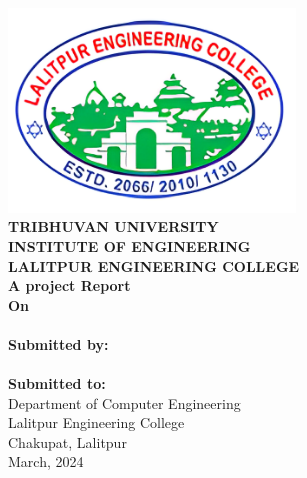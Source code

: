 \begin{center}

    \thispagestyle{empty}

    \includegraphics[width= 3in ]{img/leclogo21.png} \\
    \vspace{0.05 in}
    {\fontsize{12 pt}{12} \selectfont\textbf{TRIBHUVAN UNIVERSITY} \\
        \textbf{INSTITUTE OF ENGINEERING} \\
        \textbf{LALITPUR ENGINEERING COLLEGE}} \\

    \vspace{0.5 in}
    \textbf{A project Report}\\
    {\fontsize{12 pt}{12} \selectfont\textbf{On}\\}
    {\fontsize{12 pt}{12} \selectfont \textbf{\thetitle}}\\
    \vspace{1.1 in}
    \textbf{ Submitted by:}  \\
    {\theauthor} \\
    \vspace{0.8 in}
    \textbf{ Submitted to:}  \\
    Department of Computer Engineering \\
    Lalitpur Engineering College \\
    Chakupat, Lalitpur \\
    \vspace{0.7 in}
    March, 2024 \\
\end{center}